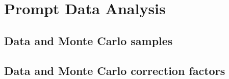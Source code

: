 \chapter{Prompt Data Analysis}

\section{Data and Monte Carlo samples}

\section{Data and Monte Carlo correction factors}

\subsection{}
